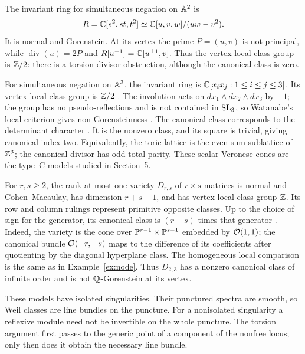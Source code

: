 \begin{example}\label{ex:veronese}
The invariant ring for simultaneous negation on $\mathbb A^2$ is
\[
 R=\mathbb C[s^2,st,t^2]\simeq\mathbb C[u,v,w]/(uw-v^2).
\]
It is normal and Gorenstein. At its vertex the prime $P=(u,v)$ is not principal, while $\operatorname{div}(u)=2P$ and $R[u^{-1}]=\mathbb C[u^{\pm1},v]$. Thus the vertex local class group is $\mathbb Z/2$: there is a torsion divisor obstruction, although the canonical class is zero.

For simultaneous negation on $\mathbb A^3$, the invariant ring is $\mathbb C[x_ix_j:1\le i\le j\le3]$. Its vertex local class group is $\mathbb Z/2$ \cite[Section~1.2, Proposition~I]{Wat74}. The involution acts on $dx_1\wedge dx_2\wedge dx_3$ by $-1$; the group has no pseudo-reflections and is not contained in $\operatorname{SL}_3$, so Watanabe's local criterion gives non-Gorensteinness \cite[Theorem~2]{Wat74}. The canonical class corresponds to the determinant character \cite[Section~2, Theorem~$1^\prime$, pp.~383--384]{Wat74}. It is the nonzero class, and its square is trivial, giving canonical index two. Equivalently, the toric lattice is the even-sum sublattice of $\mathbb Z^3$; the canonical divisor has odd total parity. These scalar Veronese cones are the type~C models studied in Section~5.
\end{example}

\begin{example}\label{ex:determinantal}
For $r,s\ge2$, the rank-at-most-one variety $D_{r,s}$ of $r\times s$ matrices is normal and Cohen--Macaulay, has dimension $r+s-1$, and has vertex local class group $\mathbb Z$. Its row and column rulings represent primitive opposite classes. Up to the choice of sign for the generator, its canonical class is $(r-s)$ times that generator \cite[Corollary~8.4, Theorem~8.8 and Corollary~8.9]{BV88}. Indeed, the variety is the cone over $\mathbb P^{r-1}\times\mathbb P^{s-1}$ embedded by $\mathcal O(1,1)$; the canonical bundle $\mathcal O(-r,-s)$ maps to the difference of its coefficients after quotienting by the diagonal hyperplane class. The homogeneous local comparison is the same as in Example~\ref{ex:node}. Thus $D_{2,3}$ has a nonzero canonical class of infinite order and is not $\mathbb Q$-Gorenstein at its vertex.
\end{example}

These models have isolated singularities. Their punctured spectra are smooth, so Weil classes are line bundles on the puncture. For a nonisolated singularity a reflexive module need not be invertible on the whole puncture. The torsion argument first passes to the generic point of a component of the nonfree locus; only then does it obtain the necessary line bundle.

